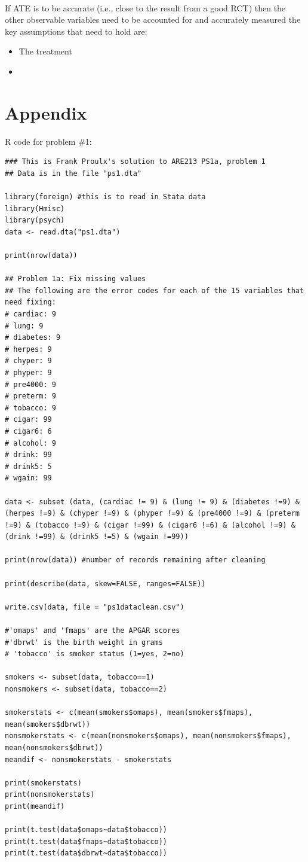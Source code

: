 \documentclass[a4paper, 12pt]{article}
\begin{document}
\paragraph{}
If ATE is to be accurate (i.e., close to the result from a good RCT) then the other observable variables need to be accounted for and accurately measured  the key assumptions that need to hold are:

\begin{itemize}

\item The treatment
\item 

\end{itemize}


\pagebreak
\section{Appendix}
R code for problem \#1:
\begin{verbatim}
### This is Frank Proulx's solution to ARE213 PS1a, problem 1
## Data is in the file "ps1.dta"

library(foreign) #this is to read in Stata data
library(Hmisc)
library(psych)
data <- read.dta("ps1.dta")

print(nrow(data))

## Problem 1a: Fix missing values
## The following are the error codes for each of the 15 variables that need fixing:
# cardiac: 9
# lung: 9
# diabetes: 9
# herpes: 9
# chyper: 9
# phyper: 9
# pre4000: 9
# preterm: 9
# tobacco: 9
# cigar: 99
# cigar6: 6
# alcohol: 9
# drink: 99
# drink5: 5
# wgain: 99

data <- subset (data, (cardiac != 9) & (lung != 9) & (diabetes !=9) & (herpes !=9) & (chyper !=9) & (phyper !=9) & (pre4000 !=9) & (preterm !=9) & (tobacco !=9) & (cigar !=99) & (cigar6 !=6) & (alcohol !=9) & (drink !=99) & (drink5 !=5) & (wgain !=99))

print(nrow(data)) #number of records remaining after cleaning

print(describe(data, skew=FALSE, ranges=FALSE))

write.csv(data, file = "ps1dataclean.csv")

#'omaps' and 'fmaps' are the APGAR scores
#'dbrwt' is the birth weight in grams
# 'tobacco' is smoker status (1=yes, 2=no)

smokers <- subset(data, tobacco==1)
nonsmokers <- subset(data, tobacco==2)

smokerstats <- c(mean(smokers$omaps), mean(smokers$fmaps), mean(smokers$dbrwt))
nonsmokerstats <- c(mean(nonsmokers$omaps), mean(nonsmokers$fmaps), mean(nonsmokers$dbrwt))
meandif <- nonsmokerstats - smokerstats

print(smokerstats)
print(nonsmokerstats)
print(meandif)

print(t.test(data$omaps~data$tobacco))
print(t.test(data$fmaps~data$tobacco))
print(t.test(data$dbrwt~data$tobacco))
\end{verbatim}
\end{document}
